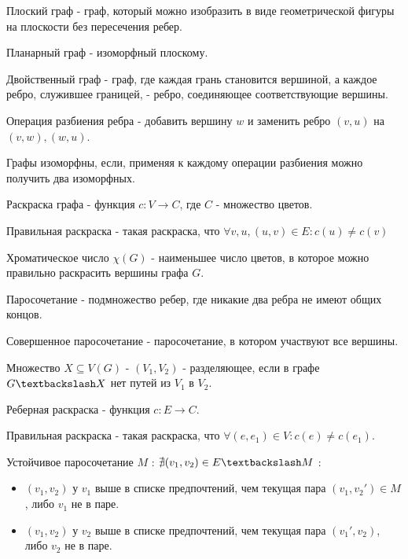\documentclass[12pt]{article}
\begin{document}
\begin{defn}
   Плоский граф - граф, который можно изобразить в виде геометрической фигуры на плоскости без пересечения ребер.
\end{defn}
\begin{defn}
    Планарный граф - изоморфный плоскому.
\end{defn}
\begin{defn}
    Двойственный граф - граф, где каждая грань становится вершиной, а каждое ребро, служившее границей, - ребро, соединяющее соответствующие вершины.
\end{defn}
\begin{defn}
    Операция разбиения ребра - добавить вершину $w$ и заменить ребро $(v, u)$ на $(v, w), (w, u)$.
\end{defn}
\begin{defn}
    Графы изоморфны, если, применяя к каждому операции разбиения можно получить два изоморфных.
\end{defn}
\begin{defn}
    Раскраска графа - функция $c: V \to C$, где $C$ - множество цветов.
\end{defn}
\begin{defn}
    Правильная раскраска - такая раскраска,  что $\forall v, u , (u, v) \in E: c(u) \ne c(v)$
\end{defn}
\begin{defn}
    Хроматическое число $\chi(G)$ - наименьшее число цветов, в которое можно правильно раскрасить вершины графа $G$.
\end{defn}
\begin{defn}
    Паросочетание - подмножество ребер, где никакие два ребра не имеют общих концов.
\end{defn}
\begin{defn}
    Совершенное паросочетание - паросочетание, в котором участвуют все вершины.
\end{defn}
\begin{defn}
    Множество $X \subseteq V(G)$ - $(V_1, V_2)$ - разделяющее, если в графе  $G \textbackslash X$ нет путей из $V_1$ в $V_2$.
\end{defn}
\begin{defn}
    Реберная раскраска - функция $c: E \to C$.
\end{defn}
\begin{defn}
    Правильная раскраска - такая раскраска, что $\forall (e, e_1) \in V: c(e) \ne c(e_1)$.
\end{defn}
\begin{defn}
    Устойчивое паросочетание $M$ : $\nexists (v_1, v_2) \in  E \textbackslash M$ :
    \begin{itemize}
	\item $(v_1, v_2)$ у $v_1$ выше в списке предпочтений, чем текущая пара $(v_1, v_2 \prime) \in  M$, либо $v_1$ не в паре.
	\item $(v_1, v_2)$ у $v_2$ выше в списке предпочтений, чем текущая пара $(v_1\prime, v_2)$, либо $v_2$ не в паре.
    \end{itemize}
\end{defn}
\end{document}
